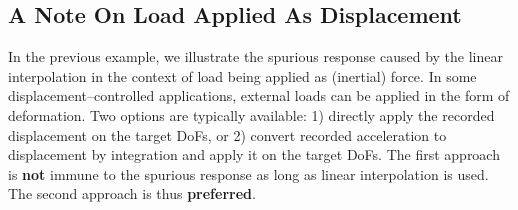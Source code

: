 \subsection{A Note On Load Applied As Displacement}
In the previous example, we illustrate the spurious response caused by the linear interpolation in the context of load being applied as (inertial) force. In some displacement--controlled applications, external loads can be applied in the form of deformation. Two options are typically available: 1) directly apply the recorded displacement on the target DoFs, or 2) convert recorded acceleration to displacement by integration and apply it on the target DoFs. The first approach is \textbf{not} immune to the spurious response as long as linear interpolation is used. The second approach is thus \textbf{preferred}.%
%
